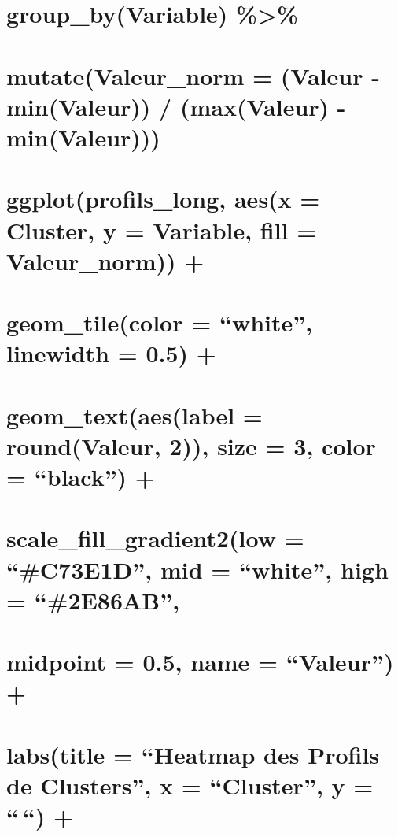 \documentclass[
]{article}
\begin{document}
\section{group\_by(Variable) \%\textgreater\%}\label{group_byvariable}

\section{mutate(Valeur\_norm = (Valeur - min(Valeur)) / (max(Valeur) -
min(Valeur)))}\label{mutatevaleur_norm-valeur---minvaleur-maxvaleur---minvaleur}

\section{ggplot(profils\_long, aes(x = Cluster, y = Variable, fill =
Valeur\_norm))
+}\label{ggplotprofils_long-aesx-cluster-y-variable-fill-valeur_norm}

\section{geom\_tile(color = ``white'', linewidth = 0.5)
+}\label{geom_tilecolor-white-linewidth-0.5}

\section{geom\_text(aes(label = round(Valeur, 2)), size = 3, color =
``black'') +}\label{geom_textaeslabel-roundvaleur-2-size-3-color-black}

\section{scale\_fill\_gradient2(low = ``\#C73E1D'', mid = ``white'',
high =
``\#2E86AB'',}\label{scale_fill_gradient2low-c73e1d-mid-white-high-2e86ab}

\section{\texorpdfstring{midpoint = 0.5, name = ``Valeur'')
+}{midpoint = 0.5, name = ``Valeur'') +}}\label{midpoint-0.5-name-valeur}

\section{labs(title = ``Heatmap des Profils de Clusters'', x =
``Cluster'', y = ``\,``)
+}\label{labstitle-heatmap-des-profils-de-clusters-x-cluster-y}
\end{document}
